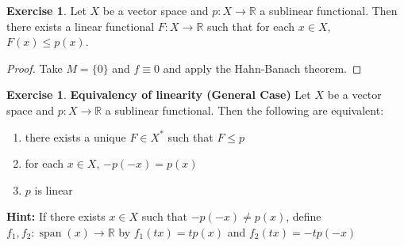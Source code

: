 \documentclass[12pt]{amsart}
\theoremstyle{definition}
\newtheorem{ex}[definition]{Exercise}
\newcommand{\R}{\mathbb{R}}
\DeclareMathOperator{\spn}{span}
\newcommand{\lex}[1]{\label{ex:#1}}
\begin{document}
	\begin{ex} \lex{55011}
		Let $X$ be a vector space and $p:X \rightarrow \R$ a sublinear functional. Then there exists a linear functional $F: X \rightarrow \R$ such that for each $x \in X$, $F(x) \leq p(x)$.
	\end{ex}
	
	\begin{proof}
		Take $M = \{0\}$ and $f \equiv 0$ and apply the Hahn-Banach theorem.
	\end{proof}	
	
	\begin{ex} \lex{55012} \textbf{Equivalency of linearity (General Case)}
		Let $X$ be a vector space and $p:X \rightarrow \R$ a sublinear functional. Then the following are equivalent:
		\begin{enumerate}
			\item there exists a unique $F \in X^*$ such that $F \leq p$
			\item for each $x \in X$, $-p(-x) = p(x)$
			\item $p$ is linear
		\end{enumerate}	
		\textbf{Hint:} If there exists $x \in X$ such that $-p(-x) \neq p(x)$, define $f_1,f_2 :\spn(x) \rightarrow \R$ by $f_1(tx) = t p(x)$ and $f_2(tx) = -tp(-x)$
	\end{ex}	
	
\end{document}

